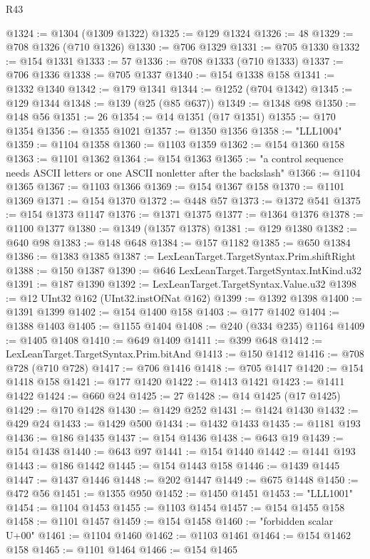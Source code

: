 \begin{lexlean}{R43}
\begin{coremodule}
@1324 := @1304 (@1309 @1322)
@1325 := @129 @1324
@1326 := 48
@1329 := @708 @1326 (@710 @1326)
@1330 := @706 @1329
@1331 := @705 @1330
@1332 := @154 @1331
@1333 := 57
@1336 := @708 @1333 (@710 @1333)
@1337 := @706 @1336
@1338 := @705 @1337
@1340 := @154 @1338 @158
@1341 := @1332 @1340
@1342 := @179 @1341
@1344 := @1252 (@704 @1342)
@1345 := @129 @1344
@1348 := @139 (@25 (@85 @637))
@1349 := @1348 @98
@1350 := @148 @56
@1351 := 26
@1354 := @14 @1351 (@17 @1351)
@1355 := @170 @1354
@1356 := @1355 @1021
@1357 := @1350 @1356
@1358 := "LLL1004"
@1359 := @1104 @1358
@1360 := @1103 @1359
@1362 := @154 @1360 @158
@1363 := @1101 @1362
@1364 := @154 @1363
@1365 := "a control sequence needs ASCII letters or one ASCII nonletter after the backslash"
@1366 := @1104 @1365
@1367 := @1103 @1366
@1369 := @154 @1367 @158
@1370 := @1101 @1369
@1371 := @154 @1370
@1372 := @448 @57
@1373 := @1372 @541
@1375 := @154 @1373 @1147
@1376 := @1371 @1375
@1377 := @1364 @1376
@1378 := @1100 @1377
@1380 := @1349 (@1357 @1378)
@1381 := @129 @1380
@1382 := @640 @98
@1383 := @148 @648
@1384 := @157 @1182
@1385 := @650 @1384
@1386 := @1383 @1385
@1387 := LexLeanTarget.TargetSyntax.Prim.shiftRight
@1388 := @150 @1387
@1390 := @646 LexLeanTarget.TargetSyntax.IntKind.u32
@1391 := @187 @1390
@1392 := LexLeanTarget.TargetSyntax.Value.u32
@1398 := @12 UInt32 @162 (UInt32.instOfNat @162)
@1399 := @1392 @1398
@1400 := @1391 @1399
@1402 := @154 @1400 @158
@1403 := @177 @1402
@1404 := @1388 @1403
@1405 := @1155 @1404
@1408 := @240 (@334 @235) @1164
@1409 := @1405 @1408
@1410 := @649 @1409
@1411 := @399 @648
@1412 := LexLeanTarget.TargetSyntax.Prim.bitAnd
@1413 := @150 @1412
@1416 := @708 @728 (@710 @728)
@1417 := @706 @1416
@1418 := @705 @1417
@1420 := @154 @1418 @158
@1421 := @177 @1420
@1422 := @1413 @1421
@1423 := @1411 @1422
@1424 := @660 @24
@1425 := 27
@1428 := @14 @1425 (@17 @1425)
@1429 := @170 @1428
@1430 := @1429 @252
@1431 := @1424 @1430
@1432 := @429 @24
@1433 := @1429 @500
@1434 := @1432 @1433
@1435 := @1181 @193
@1436 := @186 @1435
@1437 := @154 @1436
@1438 := @643 @19
@1439 := @154 @1438
@1440 := @643 @97
@1441 := @154 @1440
@1442 := @1441 @193
@1443 := @186 @1442
@1445 := @154 @1443 @158
@1446 := @1439 @1445
@1447 := @1437 @1446
@1448 := @202 @1447
@1449 := @675 @1448
@1450 := @472 @56
@1451 := @1355 @950
@1452 := @1450 @1451
@1453 := "LLL1001"
@1454 := @1104 @1453
@1455 := @1103 @1454
@1457 := @154 @1455 @158
@1458 := @1101 @1457
@1459 := @154 @1458
@1460 := "forbidden scalar U+00"
@1461 := @1104 @1460
@1462 := @1103 @1461
@1464 := @154 @1462 @158
@1465 := @1101 @1464
@1466 := @154 @1465

\end{coremodule}
\end{lexlean}
